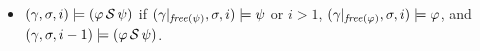 \begin{itemize}
\item $( \gamma , \sigma , i ) \models ( \varphi \, {\cal S} \, \psi )$ if
$( \gamma |_{\mathit{free} ( \psi )} , \sigma , i ) \models \psi$ or $i>1$,
$( \gamma |_{\mathit{free} ( \varphi )} , \sigma , i ) \models \varphi$, and 
$( \gamma , \sigma , i-1 ) \models ( \varphi \, {\cal S} \, \psi )$.
\end{itemize}
\fi %
 


